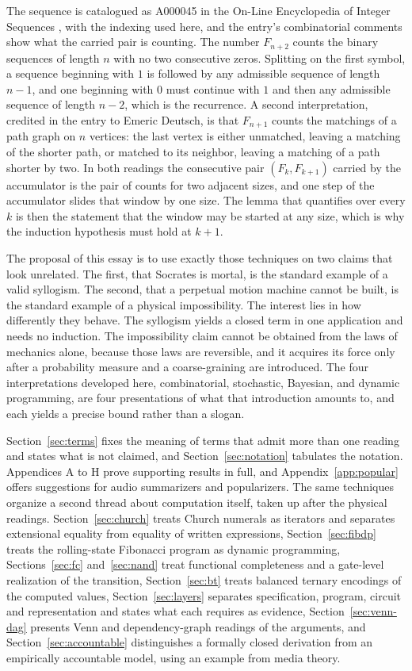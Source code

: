 \documentclass[11pt]{article}
\theoremstyle{definition}
\theoremstyle{remark}
\begin{document}
The sequence is catalogued as A000045 in the On-Line Encyclopedia of Integer Sequences \cite{oeis}, with the indexing used here, and the entry's combinatorial comments show what the carried pair is counting. The number $F_{n+2}$ counts the binary sequences of length $n$ with no two consecutive zeros. Splitting on the first symbol, a sequence beginning with $1$ is followed by any admissible sequence of length $n-1$, and one beginning with $0$ must continue with $1$ and then any admissible sequence of length $n-2$, which is the recurrence. A second interpretation, credited in the entry to Emeric Deutsch, is that $F_{n+1}$ counts the matchings of a path graph on $n$ vertices: the last vertex is either unmatched, leaving a matching of the shorter path, or matched to its neighbor, leaving a matching of a path shorter by two. In both readings the consecutive pair $(F_k, F_{k+1})$ carried by the accumulator is the pair of counts for two adjacent sizes, and one step of the accumulator slides that window by one size. The lemma that quantifies over every $k$ is then the statement that the window may be started at any size, which is why the induction hypothesis must hold at $k+1$.

The proposal of this essay is to use exactly those techniques on two claims that look unrelated. The first, that Socrates is mortal, is the standard example of a valid syllogism. The second, that a perpetual motion machine cannot be built, is the standard example of a physical impossibility. The interest lies in how differently they behave. The syllogism yields a closed term in one application and needs no induction. The impossibility claim cannot be obtained from the laws of mechanics alone, because those laws are reversible, and it acquires its force only after a probability measure and a coarse-graining are introduced. The four interpretations developed here, combinatorial, stochastic, Bayesian, and dynamic programming, are four presentations of what that introduction amounts to, and each yields a precise bound rather than a slogan.

Section~\ref{sec:terms} fixes the meaning of terms that admit more than one reading and states what is not claimed, and Section~\ref{sec:notation} tabulates the notation. Appendices A to H prove supporting results in full, and Appendix~\ref{app:popular} offers suggestions for audio summarizers and popularizers. The same techniques organize a second thread about computation itself, taken up after the physical readings. Section~\ref{sec:church} treats Church numerals as iterators and separates extensional equality from equality of written expressions, Section~\ref{sec:fibdp} treats the rolling-state Fibonacci program as dynamic programming, Sections~\ref{sec:fc} and~\ref{sec:nand} treat functional completeness and a gate-level realization of the transition, Section~\ref{sec:bt} treats balanced ternary encodings of the computed values, Section~\ref{sec:layers} separates specification, program, circuit and representation and states what each requires as evidence, Section~\ref{sec:venn-dag} presents Venn and dependency-graph readings of the arguments, and Section~\ref{sec:accountable} distinguishes a formally closed derivation from an empirically accountable model, using an example from media theory.
\end{document}
